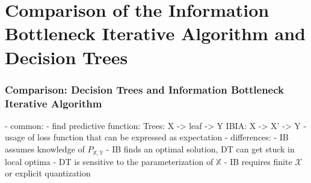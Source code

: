 \section[Comparison]{Comparison of the Information Bottleneck Iterative Algorithm and Decision Trees} 

\begin{frame}
\frametitle{Comparison: Decision Trees and Information Bottleneck Iterative Algorithm}

- common:
    - find predictive function:
        Trees: X -> leaf -> Y
        IBIA: X -> X' -> Y
    - usage of loss function that can be expressed as expectation
- differences:
    - IB assumes knowledge of $P_{\mathbb{X}, \mathbb{Y}}$
    - IB finds an optimal solution, DT can get stuck in local optima
    - DT is sensitive to the parameterization of $\mathbb{X}$
    - IB requires finite $\mathcal{X}$ or explicit quantization

\end{frame}